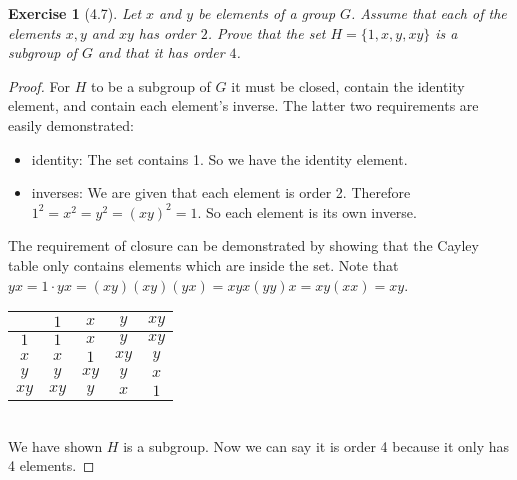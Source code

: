 \documentclass[12pt,leqno]{article}
\numberwithin{equation}{section}
\newtheorem*{exer}{Exercise}
\theoremstyle{definition}
\begin{document}
\begin{exer}[4.7]
Let $x$ and $y$ be elements of a group $G$. Assume that each of the elements $x,y$ and $xy$ has order $2$. Prove that the set $H=\{1,x,y,xy\}$ is a subgroup of $G$ and that it has order $4$.
\end{exer}

\begin{proof}[Proof]

    For $H$ to be a subgroup of $G$ it must be closed, contain the identity
    element, and contain each element's inverse. The latter two requirements are
    easily demonstrated:

    \begin{itemize}

        \item identity: The set contains 1. So we have the identity element.

        \item inverses: We are given that each element is order 2. Therefore
            $1^2 = x^2 = y^2 = (xy)^2 = 1$. So each element is its own inverse.

    \end{itemize}

    The requirement of closure can be demonstrated by showing that the Cayley
    table only contains elements which are inside the set. Note that $yx = 1
    \cdot yx = (xy)(xy)(yx) = xyx(yy)x = xy(xx) = xy$.
    \hfill \\

    \begin{center}
    \begin{tabular}{|c|c|c|c|c|}
        \hline  &       $1$&    $x$&    $y$&    $xy$    \\
        \hline  $1$&    $1$&    $x$&    $y$&    $xy$    \\
        \hline  $x$&    $x$&    $1$&    $xy$&   $y$ \\
        \hline  $y$&    $y$&    $xy$&   $y$&    $x$ \\
        \hline  $xy$&   $xy$&   $y$&    $x$&    $1$ \\
        \hline
    \end{tabular}
    \end{center}
    \hfill \\

    We have shown $H$ is a subgroup. Now we can say it is order 4 because it only
    has 4 elements.

\end{proof}
\end{document}
